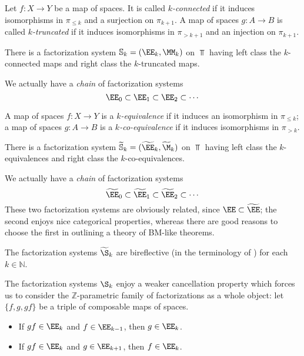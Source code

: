 \begin{definition}		
Let $f\colon X\to Y$ be a map of spaces. It is called \emph{$k$-connected} if it induces isomorphisms in $\pi_{\le k}$ and a surjection on $\pi_{k+1}$. A map of spaces $g\colon A\to B$ is called \emph{$k$-truncated} if it induces isomorphisms in $\pi_{> k+1}$ and an injection on $\pi_{k+1}$.		
\end{definition}		
\begin{proposition}		
There is a factorization system $\mathbb{S}_k = (\EE_k,\MM_k)$ on $\Top$ having left class the $k$-connected maps and right class the $k$-truncated maps.		
\end{proposition}		
We actually have a \emph{chain} of factorization systems		
\[		
\EE_0\subset \EE_1\subset \EE_2\subset\cdots		
\]		
\begin{definition}		
A map of spaces $f\colon X\to Y$ is a \emph{$k$-equivalence} if it induces an isomorphism in $\pi_{\le k}$; a map of spaces $g\colon A\to B$ is a \emph{$k$-co-equivalence} if it induces isomorphisms in $\pi_{ > k}$.		
\end{definition}		
\begin{proposition}		
There is a factorization system $\widetilde{\mathbb{S}}_k = (\widetilde{\EE}_k,\widetilde{\M}_k)$ on $\Top$ having left class the $k$-equivalences and right class the $k$-co-equivalences.		
\end{proposition}		
We actually have a \emph{chain} of factorization systems		
\[		
\widetilde{\EE}_0\subset \widetilde{\EE}_1\subset \widetilde{\EE}_2\subset\cdots		
\]		
These two factorization systems are obviously related, since $\EE\subset \widetilde{\EE}$; the second enjoys nice categorical properties, whereas there are good reasons to choose the first in outlining a theory of BM-like theorems.		
\begin{remark}		
The factorization systems $\widetilde{\S}_k$ are bireflective (in the terminology of \cite{Fiorenza2014}) for each $k\in\mathbb N$.		
		
The factorization systems $\S_k$ enjoy a weaker cancellation property which forces us to consider the $\mathbb{Z}$-parametric family of factorizations as a whole object: let $\{f,g,gf\}$ be a triple of composable maps of spaces.		
\begin{itemize}		
\item If $gf\in\EE_k$ and $f\in\EE_{k-1}$, then $g\in \EE_k$.		
\item If $gf\in\EE_k$ and $g\in\EE_{k+1}$, then $f\in \EE_k$.		
\end{itemize}		
\end{remark}		
